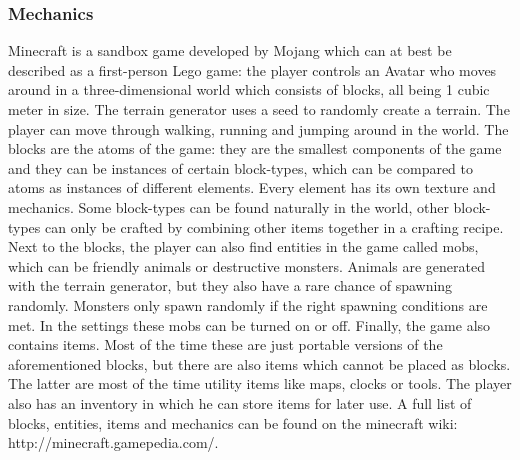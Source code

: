 \documentclass[12pt]{report} %
\begin{document}
\subsubsection{Mechanics}

Minecraft is a sandbox game developed by Mojang which can at best be described as a first-person Lego game: the player controls an Avatar who moves around in a three-dimensional world which consists of blocks, all being 1 cubic meter in size. The terrain generator uses a seed to randomly create a terrain. The player can move through walking, running and jumping around in the world. The blocks are the atoms of the game: they are the smallest components of the game and they can be instances of certain block-types, which can be compared to atoms as instances of different elements. Every element has its own texture and mechanics. Some block-types can be found naturally in the world, other block-types can only be crafted by combining other items together in a crafting recipe. Next to the blocks, the player can also find entities in the game called mobs, which can be friendly animals or destructive monsters. Animals are generated with the terrain generator, but they also have a rare chance of spawning randomly. Monsters only spawn randomly if the right spawning conditions are met. In the settings these mobs can be turned on or off. Finally, the game also contains items. Most of the time these are just portable versions of the aforementioned blocks, but there are also items which cannot be placed as blocks. The latter are most of the time utility items like maps, clocks or tools. The player also has an inventory in which he can store items for later use. A full list of blocks, entities, items and mechanics can be found on the minecraft wiki: http://minecraft.gamepedia.com/.
\end{document}

